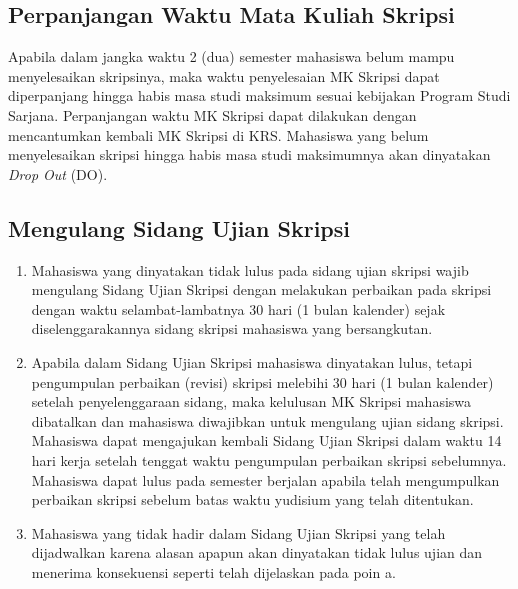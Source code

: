 \documentclass[
  indonesian,
  letterpaper,
]{scrbook}
\providecommand{\tightlist}{%
  \setlength{\itemsep}{0pt}\setlength{\parskip}{0pt}}
\begin{document}
\subsection*{Perpanjangan Waktu Mata Kuliah
Skripsi}\label{perpanjangan-waktu-mata-kuliah-skripsi}

Apabila dalam jangka waktu 2 (dua) semester mahasiswa belum mampu
menyelesaikan skripsinya, maka waktu penyelesaian MK Skripsi dapat
diperpanjang hingga habis masa studi maksimum sesuai kebijakan Program
Studi Sarjana. Perpanjangan waktu MK Skripsi dapat dilakukan dengan
mencantumkan kembali MK Skripsi di KRS. Mahasiswa yang belum
menyelesaikan skripsi hingga habis masa studi maksimumnya akan
dinyatakan \emph{Drop Out} (DO).

\subsection*{Mengulang Sidang Ujian
Skripsi}\label{mengulang-sidang-ujian-skripsi}

\begin{enumerate}
\def\labelenumi{\alph{enumi}.}
\tightlist
\item
  Mahasiswa yang dinyatakan tidak lulus pada sidang ujian skripsi wajib
  mengulang Sidang Ujian Skripsi dengan melakukan perbaikan pada skripsi
  dengan waktu selambat-lambatnya 30 hari (1 bulan kalender) sejak
  diselenggarakannya sidang skripsi mahasiswa yang bersangkutan.
\item
  Apabila dalam Sidang Ujian Skripsi mahasiswa dinyatakan lulus, tetapi
  pengumpulan perbaikan (revisi) skripsi melebihi 30 hari (1 bulan
  kalender) setelah penyelenggaraan sidang, maka kelulusan MK Skripsi
  mahasiswa dibatalkan dan mahasiswa diwajibkan untuk mengulang ujian
  sidang skripsi. Mahasiswa dapat mengajukan kembali Sidang Ujian
  Skripsi dalam waktu 14 hari kerja setelah tenggat waktu pengumpulan
  perbaikan skripsi sebelumnya. Mahasiswa dapat lulus pada semester
  berjalan apabila telah mengumpulkan perbaikan skripsi sebelum batas
  waktu yudisium yang telah ditentukan.
\item
  Mahasiswa yang tidak hadir dalam Sidang Ujian Skripsi yang telah
  dijadwalkan karena alasan apapun akan dinyatakan tidak lulus ujian dan
  menerima konsekuensi seperti telah dijelaskan pada poin a.
\end{enumerate}
\end{document}
